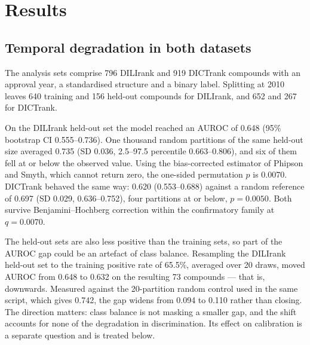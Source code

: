 
\section{Results}

\subsection{Temporal degradation in both datasets}

The analysis sets comprise 796 DILIrank and 919 DICTrank compounds with an
approval year, a standardised structure and a binary label. Splitting at 2010
leaves 640 training and 156 held-out compounds for DILIrank, and 652 and 267 for
DICTrank.

On the DILIrank held-out set the model reached an AUROC of 0.648 (95\% bootstrap
CI 0.555--0.736). One thousand random partitions of the same held-out size
averaged 0.735 (SD 0.036, 2.5--97.5 percentile 0.663--0.806), and six of them fell
at or below the observed value. Using the bias-corrected estimator of Phipson and
Smyth, which cannot return zero, the one-sided permutation $p$ is 0.0070.
DICTrank behaved the same way: 0.620 (0.553--0.688) against a random reference of
0.697 (SD 0.029, 0.636--0.752), four partitions at or below, $p = 0.0050$. Both
survive Benjamini--Hochberg correction within the confirmatory family at
$q = 0.0070$.

The held-out sets are also less positive than the training sets, so part of the
AUROC gap could be an artefact of class balance. Resampling the DILIrank held-out
set to the training positive rate of 65.5\%, averaged over 20 draws, moved AUROC
from 0.648 to 0.632 on the resulting 73 compounds --- that is, downwards. Measured
against the 20-partition random control used in the same script, which gives
0.742, the gap widens from 0.094 to 0.110 rather than closing. The direction
matters: class
balance is not masking a smaller gap, and the shift accounts for none of the
degradation in discrimination. Its effect on calibration is a separate question
and is treated below.

